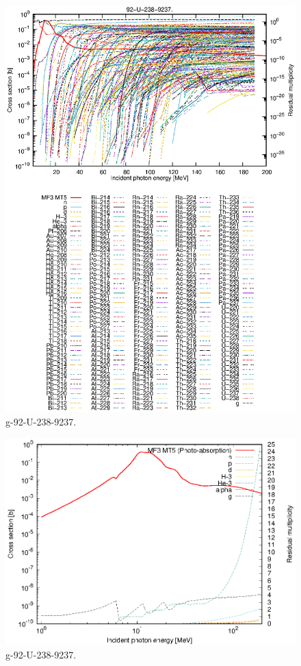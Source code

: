 \begin{figure}
 \includegraphics[width=\linewidth]{eps/g_92-U-238_9237.eps}
  \caption{g-92-U-238-9237.}
\end{figure}
\newpage \clearpage

\begin{figure}
 \includegraphics[width=\linewidth]{eps-log/g_92-U-238_9237.eps}
 \caption{g-92-U-238-9237.}
\end{figure}
\newpage \clearpage

